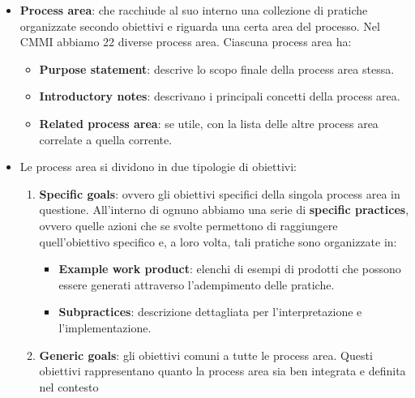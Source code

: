 \begin{itemize}
      \item \textbf{Process area}: che racchiude al suo interno una collezione di
            pratiche organizzate secondo obiettivi e riguarda una certa area del
            processo. Nel CMMI abbiamo 22 diverse process area. Ciascuna process
            area ha:
            \begin{itemize}
                  \item \textbf{Purpose statement}: descrive lo scopo finale
                        della process area stessa.
                  \item \textbf{Introductory notes}: descrivano i principali
                        concetti della process area.
                  \item \textbf{Related process area}: se utile, con la lista
                        delle altre process area correlate a quella corrente.
            \end{itemize}
      \item Le process area si dividono in due tipologie di obiettivi:
            \begin{enumerate}
                  \item \textbf{Specific goals}: ovvero gli obiettivi specifici
                        della singola process area in questione. All'interno di
                        ognuno abbiamo una serie di \textbf{specific practices},
                        ovvero quelle azioni che se svolte permettono di raggiungere
                        quell'obiettivo specifico e, a loro volta, tali pratiche
                        sono organizzate in:
                        \begin{itemize}
                              \item \textbf{Example work product}: elenchi di
                                    esempi di prodotti che possono essere generati
                                    attraverso l'adempimento delle pratiche.
                              \item \textbf{Subpractices}: descrizione dettagliata
                                    per l'interpretazione e l'implementazione.
                        \end{itemize}
                  \item \textbf{Generic goals}: gli obiettivi comuni a tutte
                        le process area. Questi obiettivi rappresentano quanto la
                        process area sia ben integrata e definita nel contesto

\end{enumerate}
\end{itemize}
